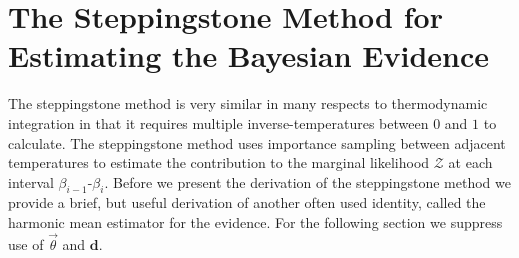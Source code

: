 \section{The Steppingstone Method for Estimating the Bayesian Evidence}
The steppingstone method is very similar in many respects to thermodynamic integration in that it requires multiple inverse-temperatures between $0$ and $1$ to calculate. The steppingstone method uses importance sampling between adjacent temperatures to estimate the contribution to the marginal likelihood $\mathcal{Z}$ at each interval $\beta_{i-1}$-$\beta_i$. Before we present the derivation of the steppingstone method we provide a brief, but useful derivation of another often used identity, called the harmonic mean estimator for the evidence. For the following section we suppress use of $\vec{\theta}$ and $\mathbf{d}$.

